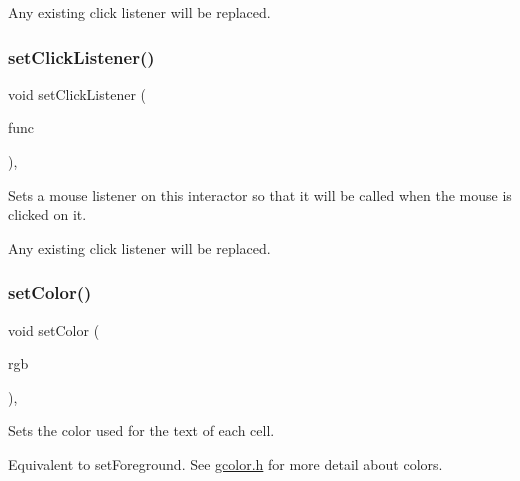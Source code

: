 Any existing click listener will be replaced. \mbox{\label{classsgl_1_1GInteractor_a856414c92df90f56f3877475eb3f8fc4}} 
\subsubsection{\texorpdfstring{set\+Click\+Listener()}{setClickListener()}\hspace{0.1cm}{\footnotesize\ttfamily [2/2]}}
{\footnotesize\ttfamily void set\+Click\+Listener (\begin{DoxyParamCaption}\item[{\mbox{\hyperlink{namespacesgl_a54427ce97bb1c2804e4fe2b0a62e8b17}{G\+Event\+Listener\+Void}}}]{func }\end{DoxyParamCaption})\hspace{0.3cm}{\ttfamily [virtual]}, {\ttfamily [inherited]}}



Sets a mouse listener on this interactor so that it will be called when the mouse is clicked on it. 

Any existing click listener will be replaced. \mbox{\label{classsgl_1_1GTable_a165735fb49fa7db12602d32557cbfe0d}} 
\subsubsection{\texorpdfstring{set\+Color()}{setColor()}\hspace{0.1cm}{\footnotesize\ttfamily [1/2]}}
{\footnotesize\ttfamily void set\+Color (\begin{DoxyParamCaption}\item[{int}]{rgb }\end{DoxyParamCaption})\hspace{0.3cm}{\ttfamily [override]}, {\ttfamily [virtual]}}



Sets the color used for the text of each cell. 

Equivalent to set\+Foreground. See \mbox{\hyperlink{gcolor_8h_source}{gcolor.\+h}} for more detail about colors. 

